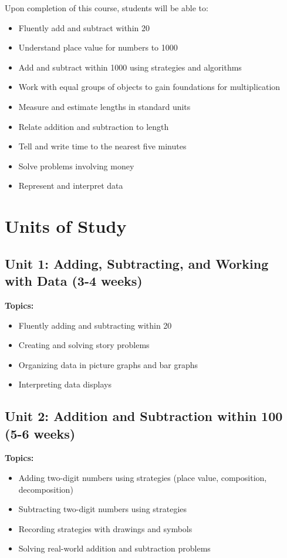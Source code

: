 \documentclass[11pt,letterpaper]{report}
\begin{document}
Upon completion of this course, students will be able to:

\begin{itemize}
    \item Fluently add and subtract within 20
    \item Understand place value for numbers to 1000
    \item Add and subtract within 1000 using strategies and algorithms
    \item Work with equal groups of objects to gain foundations for multiplication
    \item Measure and estimate lengths in standard units
    \item Relate addition and subtraction to length
    \item Tell and write time to the nearest five minutes
    \item Solve problems involving money
    \item Represent and interpret data
\end{itemize}

\section{Units of Study}

\subsection{Unit 1: Adding, Subtracting, and Working with Data (3-4 weeks)}

\textbf{Topics:}
\begin{itemize}
    \item Fluently adding and subtracting within 20
    \item Creating and solving story problems
    \item Organizing data in picture graphs and bar graphs
    \item Interpreting data displays
\end{itemize}

\subsection{Unit 2: Addition and Subtraction within 100 (5-6 weeks)}

\textbf{Topics:}
\begin{itemize}
    \item Adding two-digit numbers using strategies (place value, composition, decomposition)
    \item Subtracting two-digit numbers using strategies
    \item Recording strategies with drawings and symbols
    \item Solving real-world addition and subtraction problems
\end{itemize}
\end{document}
